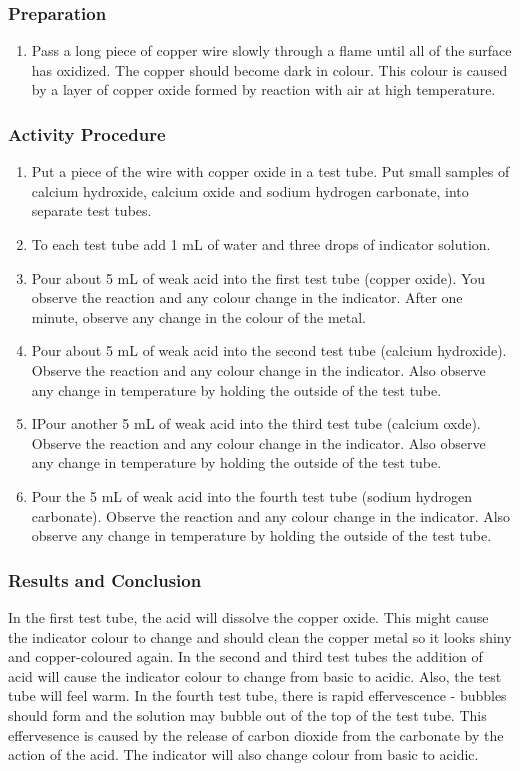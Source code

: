 \subsubsection*{Preparation}
\begin{enumerate}
\item{Pass a long piece of copper wire slowly through a flame until all of the surface has oxidized. The copper should become dark in colour. This colour is caused by a layer of copper oxide formed by reaction with air at high temperature.}
\end{enumerate}

\subsubsection*{Activity Procedure}
\begin{enumerate}
\item{Put a piece of the wire with copper oxide in a test tube. Put small samples of calcium hydroxide, calcium oxide and sodium hydrogen carbonate, into separate test tubes.}
\item{To each test tube add 1 mL of water and three drops of indicator solution.}
\item{Pour about 5 mL of weak acid into the first test tube (copper oxide). You observe the reaction and any colour change in the indicator. After one minute, observe any change in the colour of the metal.}
\item{Pour about 5 mL of weak acid into the second test tube (calcium hydroxide). Observe the reaction and any colour change in the indicator. Also observe any change in temperature by holding the outside of the test tube.}
\item{IPour another 5 mL of  weak acid into the third test tube (calcium oxde). Observe the reaction and any colour change in the indicator. Also observe any change in temperature by holding the outside of the test tube.}
\item{Pour the 5 mL of weak acid into the fourth test tube (sodium hydrogen carbonate). Observe the reaction and any colour change in the indicator. Also observe any change in temperature by holding the outside of the test tube.}
\end{enumerate}

\subsubsection*{Results and Conclusion}
In the first test tube, the acid will dissolve the copper oxide. This might cause the indicator colour to change and should clean the copper metal so it looks shiny and copper-coloured again.
In the second and third test tubes the addition of acid will cause the indicator colour to change from basic to acidic. Also, the test tube will feel warm.
In the fourth test tube, there is rapid effervescence - bubbles should form and the solution may bubble out of the top of the test tube. This effervesence is caused by the release of carbon dioxide from the carbonate by the action of the acid. The indicator will also change colour from basic to acidic.

